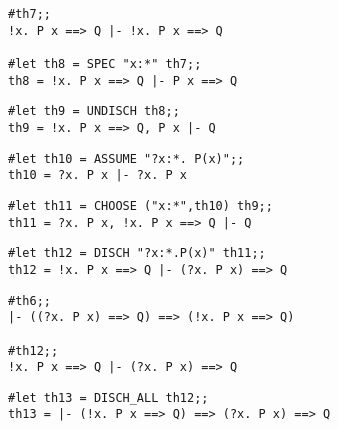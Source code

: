 \vskip 4mm
\begin{session}\begin{verbatim}
#th7;;
!x. P x ==> Q |- !x. P x ==> Q

#let th8 = SPEC "x:*" th7;;
th8 = !x. P x ==> Q |- P x ==> Q
\end{verbatim}\end{session}

\vskip 4mm
\begin{session}\begin{verbatim}
#let th9 = UNDISCH th8;;
th9 = !x. P x ==> Q, P x |- Q
\end{verbatim}\end{session}

\vskip 4mm
\begin{session}\begin{verbatim}
#let th10 = ASSUME "?x:*. P(x)";;
th10 = ?x. P x |- ?x. P x
\end{verbatim}\end{session}

\vskip 4mm
\begin{session}\begin{verbatim}
#let th11 = CHOOSE ("x:*",th10) th9;;
th11 = ?x. P x, !x. P x ==> Q |- Q
\end{verbatim}\end{session}

\vskip 4mm
\begin{session}\begin{verbatim}
#let th12 = DISCH "?x:*.P(x)" th11;;
th12 = !x. P x ==> Q |- (?x. P x) ==> Q
\end{verbatim}\end{session}


\vskip 4mm
\begin{session}\begin{verbatim}
#th6;;
|- ((?x. P x) ==> Q) ==> (!x. P x ==> Q)

#th12;;
!x. P x ==> Q |- (?x. P x) ==> Q
\end{verbatim}\end{session}

\vskip 4mm
\begin{session}\begin{verbatim}
#let th13 = DISCH_ALL th12;;
th13 = |- (!x. P x ==> Q) ==> (?x. P x) ==> Q
\end{verbatim}\end{session}

